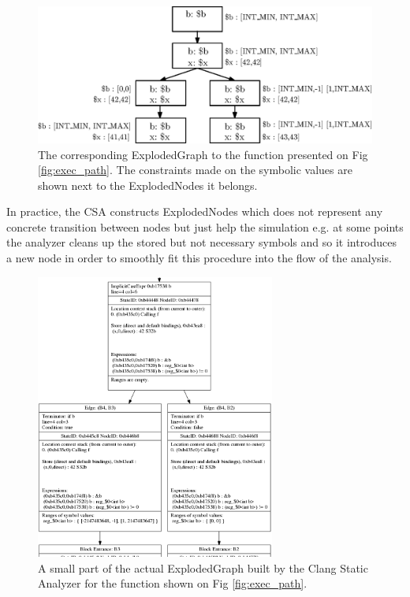 \begin{figure}[h]
	\centering
	\includegraphics[width=1\textwidth]{img/explodedgraph.eps}
	\caption{The corresponding ExplodedGraph to the function presented on Fig 
		\ref{fig:exec_path}. The constraints made on the symbolic values are 
		shown next to the ExplodedNodes it belongs.}
	\label{fig:exploded_graph}
\end{figure}

In practice, the CSA constructs ExplodedNodes which does not represent any 
concrete transition between nodes but just help the simulation e.g. at some 
points the analyzer cleans up the stored but not necessary symbols and so it 
introduces a new node in order to smoothly fit this procedure into the flow of 
the analysis.

\begin{figure}[h]
	\centering
	\includegraphics[width=0.7\textwidth]{img/eg}
	\caption{A small part of the actual ExplodedGraph built by the Clang 
	Static Analyzer for the function shown on Fig \ref{fig:exec_path}.}
	\label{fig:exploded_graph2}
\end{figure}

